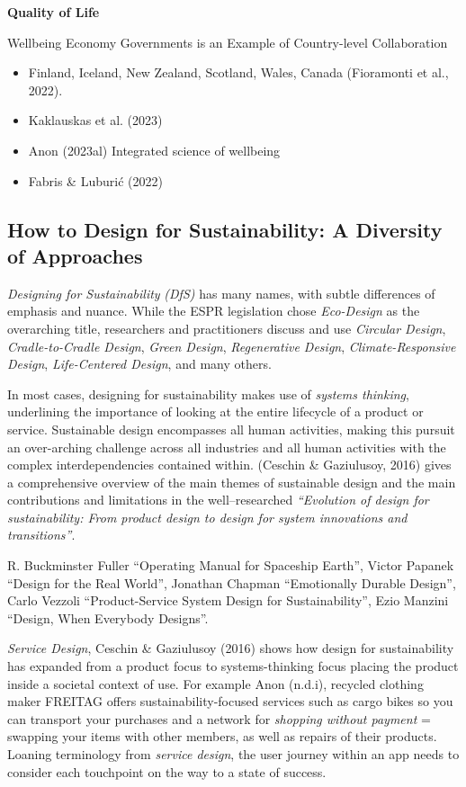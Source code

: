 \documentclass[
  letterpaper,
  DIV=11,
  numbers=noendperiod]{scrartcl}
\providecommand{\tightlist}{%
  \setlength{\itemsep}{0pt}\setlength{\parskip}{0pt}}\usepackage{longtable,booktabs,array}
\begin{document}
\textbf{Quality of Life}

Wellbeing Economy Governments is an Example of Country-level
Collaboration

\begin{itemize}
\tightlist
\item
  Finland, Iceland, New Zealand, Scotland, Wales, Canada (Fioramonti et
  al., 2022).
\item
  Kaklauskas et al. (2023)
\item
  Anon (2023al) Integrated science of wellbeing
\item
  Fabris \& Luburić (2022)
\end{itemize}

\subsection{How to Design for Sustainability: A Diversity of
Approaches}\label{how-to-design-for-sustainability-a-diversity-of-approaches}

\emph{Designing for Sustainability} \emph{(DfS)} has many names, with
subtle differences of emphasis and nuance. While the ESPR legislation
chose \emph{Eco-Design} as the overarching title, researchers and
practitioners discuss and use \emph{Circular Design},
\emph{Cradle-to-Cradle Design}, \emph{Green Design}, \emph{Regenerative
Design}, \emph{Climate-Responsive Design}, \emph{Life-Centered Design},
and many others.

In most cases, designing for sustainability makes use of \emph{systems
thinking}, underlining the importance of looking at the entire lifecycle
of a product or service. Sustainable design encompasses all human
activities, making this pursuit an over-arching challenge across all
industries and all human activities with the complex interdependencies
contained within. (Ceschin \& Gaziulusoy, 2016) gives a comprehensive
overview of the main themes of sustainable design and the main
contributions and limitations in the well--researched \emph{``Evolution
of design for sustainability: From product design to design for system
innovations and transitions''}.

R. Buckminster Fuller ``Operating Manual for Spaceship Earth'', Victor
Papanek ``Design for the Real World'', Jonathan Chapman ``Emotionally
Durable Design'', Carlo Vezzoli ``Product-Service System Design for
Sustainability'', Ezio Manzini ``Design, When Everybody Designs''.

\emph{Service Design}, Ceschin \& Gaziulusoy (2016) shows how design for
sustainability has expanded from a product focus to systems-thinking
focus placing the product inside a societal context of use. For example
Anon (n.d.i), recycled clothing maker FREITAG offers
sustainability-focused services such as cargo bikes so you can transport
your purchases and a network for \emph{shopping without payment} =
swapping your items with other members, as well as repairs of their
products. Loaning terminology from \emph{service design}, the user
journey within an app needs to consider each touchpoint on the way to a
state of success.
\end{document}
